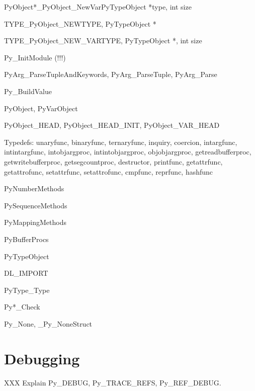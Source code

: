 \documentclass{manual}
\begin{document}
\begin{cfuncdesc}{PyObject*}{_PyObject_NewVar}{PyTypeObject *type, int size}
\end{cfuncdesc}

\begin{cfuncdesc}{TYPE}{_PyObject_NEW}{TYPE, PyTypeObject *}
\end{cfuncdesc}

\begin{cfuncdesc}{TYPE}{_PyObject_NEW_VAR}{TYPE, PyTypeObject *, int size}
\end{cfuncdesc}

Py_InitModule (!!!)

PyArg_ParseTupleAndKeywords, PyArg_ParseTuple, PyArg_Parse

Py_BuildValue

PyObject, PyVarObject

PyObject_HEAD, PyObject_HEAD_INIT, PyObject_VAR_HEAD

Typedefs:
unaryfunc, binaryfunc, ternaryfunc, inquiry, coercion, intargfunc,
intintargfunc, intobjargproc, intintobjargproc, objobjargproc,
getreadbufferproc, getwritebufferproc, getsegcountproc,
destructor, printfunc, getattrfunc, getattrofunc, setattrfunc,
setattrofunc, cmpfunc, reprfunc, hashfunc

PyNumberMethods

PySequenceMethods

PyMappingMethods

PyBufferProcs

PyTypeObject

DL_IMPORT

PyType_Type

Py*_Check

Py_None, _Py_NoneStruct


\chapter{Debugging \label{debugging}}

XXX Explain Py_DEBUG, Py_TRACE_REFS, Py_REF_DEBUG.


\end{document}
